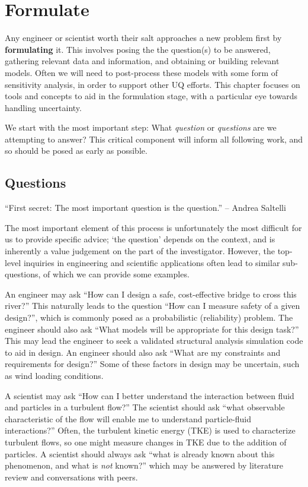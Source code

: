 \documentclass[../primer.tex]{subfiles}
\begin{document}
\chapter{Formulate} \label{ch3:formulate}
Any engineer or scientist worth their salt approaches a new problem first by
\textbf{formulating} it. This involves posing the the question(s) to be
answered, gathering relevant data and information, and obtaining or building
relevant models. Often we will need to post-process these models with some form
of sensitivity analysis, in order to support other UQ efforts. This chapter
focuses on tools and concepts to aid in the formulation stage, with a particular
eye towards handling uncertainty.

We start with the most important step: What \emph{question} or \emph{questions}
are we attempting to answer? This critical component will inform all following
work, and so should be posed as early as possible.

\section{Questions} \label{sec:ch3-questions}
``First secret: The most important question is the question.'' -- Andrea
Saltelli\cite{saltelli2000sensitivity}

The most important element of this process is unfortunately the most difficult
for us to provide specific advice; `the question' depends on the context, and is
inherently a value judgement on the part of the investigator. However, the
top-level inquiries in engineering and scientific applications often lead to
similar sub-questions, of which we can provide some examples.

An engineer may ask ``How can I design a safe, cost-effective bridge to cross
this river?'' This naturally leads to the question ``How can I measure safety of
a given design?'', which is commonly posed as a probabilistic (reliability)
problem. The engineer should also ask ``What models will be appropriate for this
design task?'' This may lead the engineer to seek a validated structural
analysis simulation code to aid in design. An engineer should also ask ``What
are my constraints and requirements for design?'' Some of these factors in
design may be uncertain, such as wind loading conditions.

A scientist may ask ``How can I better understand the interaction between fluid
and particles in a turbulent flow?'' The scientist should ask ``what observable
characteristic of the flow will enable me to understand particle-fluid
interactions?'' Often, the turbulent kinetic energy (TKE) is used to
characterize turbulent flows, so one might measure changes in TKE due to the
addition of particles. A scientist should always ask ``what is already known
about this phenomenon, and what is \emph{not} known?'' which may be answered by
literature review and conversations with peers.
\end{document}
